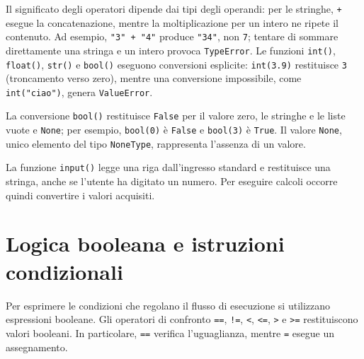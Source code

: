 Il significato degli operatori dipende dai tipi degli operandi: per le
stringhe, \texttt{+} esegue la concatenazione, mentre la moltiplicazione
per un intero ne ripete il contenuto. Ad esempio,
\lstinline|"3" + "4"| produce \lstinline|"34"|, non \texttt{7};
tentare di sommare direttamente una stringa e un intero provoca
\texttt{TypeError}. Le funzioni \texttt{int()}, \texttt{float()}, \texttt{str()} e
\texttt{bool()} eseguono conversioni esplicite: \texttt{int(3.9)}
restituisce \texttt{3} (troncamento verso zero), mentre una conversione
impossibile, come \lstinline|int("ciao")|, genera \texttt{ValueError}.

La conversione \texttt{bool()} restituisce \texttt{False} per il valore
zero, le stringhe e le liste vuote e \texttt{None}; per esempio,
\texttt{bool(0)} è \texttt{False} e \texttt{bool(3)} è
\texttt{True}. Il valore \texttt{None}, unico elemento del tipo
\texttt{NoneType}, rappresenta l'assenza di un valore.

La funzione \texttt{input()} legge una riga dall'ingresso standard e
restituisce una stringa, anche se l'utente ha digitato un numero.
Per eseguire calcoli occorre quindi convertire i valori acquisiti.



\clearpage

\section{Logica booleana e istruzioni condizionali}
\label{sec:fi-python-condizioni}

Per esprimere le condizioni che regolano il flusso di esecuzione si
utilizzano espressioni booleane. Gli operatori di confronto
\texttt{==}, \texttt{!=}, \texttt{<}, \texttt{<=}, \texttt{>} e
\texttt{>=} restituiscono valori booleani.
In particolare, \texttt{==} verifica l'uguaglianza, mentre \texttt{=}
esegue un assegnamento.

